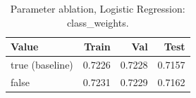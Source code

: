\begin{table}[ht]
\centering
\small
\caption{Parameter ablation, Logistic Regression: class\_weights.}
\label{tab:ablation-logistic-class-weights}
\begin{tabular}{lrrr}
\toprule
Value & Train & Val & Test \\
\midrule
true (baseline) & 0.7226 & 0.7228 & 0.7157 \\
false & 0.7231 & 0.7229 & 0.7162 \\
\bottomrule
\end{tabular}
\end{table}

